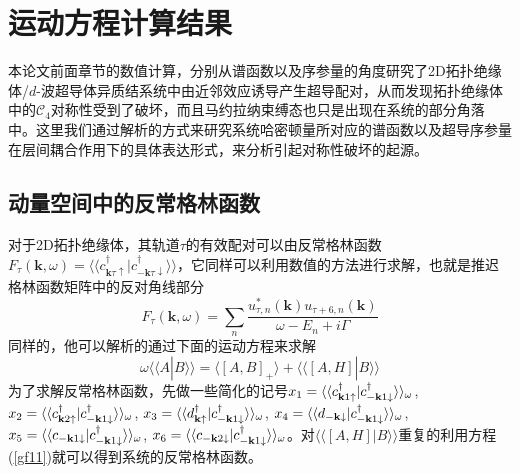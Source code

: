 \section{运动方程计算结果}
本论文前面章节的数值计算，分别从谱函数以及序参量的角度研究了2D拓扑绝缘体/$d$-波超导体异质结系统中由近邻效应诱导产生超导配对，从而发现拓扑绝缘体中的$\mathcal{C}_4$对称性受到了破坏，而且马约拉纳束缚态也只是出现在系统的部分角落中。这里我们通过解析的方式来研究系统哈密顿量所对应的谱函数以及超导序参量在层间耦合作用下的具体表达形式，来分析引起对称性破坏的起源。
\subsection{动量空间中的反常格林函数}
对于2D拓扑绝缘体，其轨道$\tau$的有效配对可以由反常格林函数$F_\tau(\mathbf{k},\omega)=\langle\langle c^\dagger_{\mathbf{k}\tau\uparrow}|c^\dagger_{\mathbf{-k}\tau\downarrow}\rangle\rangle$，它同样可以利用数值的方法进行求解，也就是推迟格林函数矩阵中的反对角线部分
\begin{equation}
F_\tau(\mathbf{k},\omega)=\sum_n\frac{u^{*}_{\tau,n}(\mathbf{k})u_{\tau+6,n}(\mathbf{k})}{\omega-E_n+i\Gamma}\label{af1}
\end{equation}
同样的，他可以解析的通过下面的运动方程来求解
\begin{equation}
\omega\langle\langle A|B\rangle\rangle=\langle\left[A,B\right]_{+}\rangle+\langle\langle\left[A,H\right]|B\rangle\rangle\label{gf11}
\end{equation}
为了求解反常格林函数，先做一些简化的记号$x_1=\langle\langle c_{{\bf k}1\uparrow}^\dagger|c_{-{\bf k}1\downarrow}^\dagger\rangle\rangle_\omega$,
$x_2 = \langle\langle c_{{\bf k}2\uparrow}^\dagger|c_{-{\bf k}1\downarrow}^\dagger\rangle\rangle_\omega$,
$x_3 = \langle\langle d_{{\bf k}\uparrow}^\dagger|c_{-{\bf k}1\downarrow}^\dagger\rangle\rangle_\omega$,
$x_4 = \langle\langle d_{-{\bf k}\downarrow}|c_{-{\bf k}1\downarrow}^\dagger\rangle\rangle_\omega$,
$x_5 = \langle\langle c_{-{\bf k}1\downarrow}|c_{-{\bf k}1\downarrow}^\dagger\rangle\rangle_\omega$,
$x_6 = \langle\langle c_{-{\bf k}2\downarrow}|c_{-{\bf k}1\downarrow}^\dagger\rangle\rangle_\omega$。对$\langle\langle\left[A,H\right]|B\rangle\rangle$重复的利用方程(\ref{gf11})就可以得到系统的反常格林函数。

